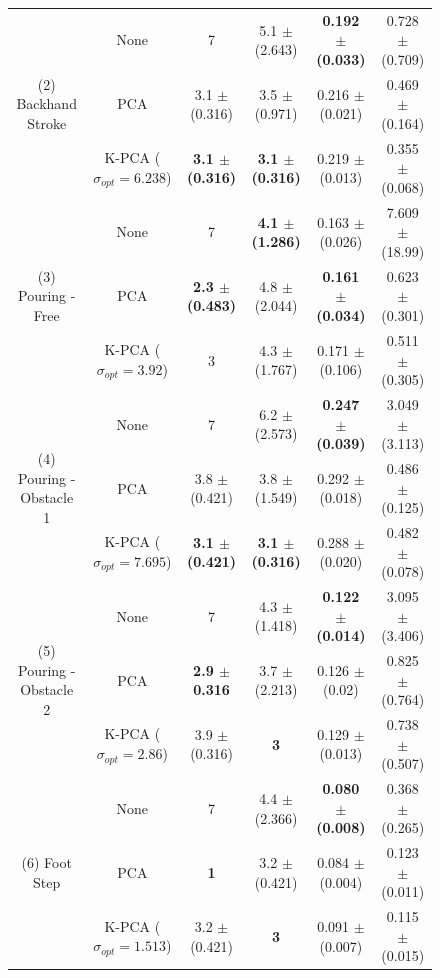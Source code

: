 \documentclass[letterpaper, 10 pt, conference,fleqn]{ieeeconf}
\begin{document}
\begin{figure}[!ht]
\begin{minipage}[b]{0.7\textwidth}
{\begin{tabular}{cc|cc|cc}
	\multicolumn{1}{c}{\multirow{3}{*}{(2) Backhand Stroke}} & None & 7 & 5.1 $\pm$ (2.643) &\textbf{ 0.192 $\pm$ (0.033)} &  \cellcolor{blue!5} 0.728 $\pm$ (0.709)  \\
		    \multicolumn{1}{c}{\multirow{3}{*}{($N=11,M=1223$)}} & PCA & 3.1 $\pm$ (0.316) & 3.5 $\pm$ (0.971) & 0.216 $\pm$ (0.021) & \cellcolor{blue!10} 0.469 $\pm$ (0.164) \\	
			& K-PCA ($\sigma_{opt} = 6.238$) & \textbf{3.1 $\pm$ (0.316)} & \textbf{3.1 $\pm$ (0.316)} & 0.219 $\pm$ (0.013) & \cellcolor{blue!15} 0.355 $\pm$ (0.068)   \\
			\hline
		
	\multicolumn{1}{c}{\multirow{3}{*}{(3) Pouring - Free}} & None & 7 & \textbf{ 4.1 $\pm$ (1.286)} & 0.163 $\pm$ (0.026) & 7.609 $\pm$ (18.99) \\
   \multicolumn{1}{c}{\multirow{3}{*}{($N=9,M=1032$)}} & PCA & \textbf{ 2.3 $\pm$ (0.483)} & 4.8 $\pm$ (2.044) & \textbf{ 0.161 $\pm$ (0.034) } & \cellcolor{blue!10} 0.623 $\pm$ (0.301) \\	
	& K-PCA ($\sigma_{opt} = 3.92$) & 3 & 4.3 $\pm$ (1.767) & 0.171 $\pm$ (0.106) & \cellcolor{blue!15} 0.511 $\pm$ (0.305)   \\
				\hline
	\multicolumn{1}{c}{\multirow{3}{*}{(4) Pouring - Obstacle 1}} & None & 7 & 6.2 $\pm$ (2.573) & \textbf{0.247 $\pm$ (0.039)} & 3.049 $\pm$ (3.113) \\
   \multicolumn{1}{c}{\multirow{3}{*}{($N=11,M=1232$)}} & PCA & 3.8 $\pm$ (0.421) & 3.8 $\pm$ (1.549) & 0.292 $\pm$ (0.018) & \cellcolor{blue!10} 0.486 $\pm$ (0.125) \\	
				& K-PCA ($\sigma_{opt} = 7.695$) & \textbf{ 3.1 $\pm$ (0.421) } & \textbf{ 3.1 $\pm$ (0.316) } & 0.288 $\pm$ (0.020) & \cellcolor{blue!15} 0.482 $\pm$ (0.078)   \\
				\hline	

	\multicolumn{1}{c}{\multirow{3}{*}{(5) Pouring - Obstacle 2}} & None & 7 & 4.3 $\pm$ (1.418) & \textbf{ 0.122 $\pm$ (0.014) } & 3.095 $\pm$ (3.406) \\
   \multicolumn{1}{c}{\multirow{3}{*}{($N=7,M=1406$)}} & PCA & \textbf{ 2.9 $\pm$ 0.316 } & 3.7 $\pm$ (2.213) & 0.126 $\pm$ (0.02) & \cellcolor{blue!10} 0.825 $\pm$ (0.764) \\	
	& K-PCA ($\sigma_{opt} = 2.86$) & 3.9 $\pm$ (0.316) & \textbf{3} & 0.129 $\pm$ (0.013) & \cellcolor{blue!15} 0.738 $\pm$ (0.507)  \\
				\hline

	\multicolumn{1}{c}{\multirow{3}{*}{(6) Foot Step}} & None & 7 & 4.4 $\pm$ (2.366) & \textbf{ 0.080 $\pm$ (0.008) } & 0.368 $\pm$ (0.265)  \\
	\multicolumn{1}{c}{\multirow{3}{*}{($N=8,M=1058$)}} & PCA & \textbf{1} & 3.2 $\pm$ (0.421) & 0.084 $\pm$ (0.004) & \cellcolor{blue!10}  0.123 $\pm$ (0.011) \\	
	& K-PCA ($\sigma_{opt} = 1.513$) & 3.2 $\pm$ (0.421) & \textbf{3} &  0.091 $\pm$ (0.007) & \cellcolor{blue!15} 0.115 $\pm$ (0.015)   \\
				\hline		
	

\end{tabular}}
\end{minipage}
\end{figure}
\end{document}
